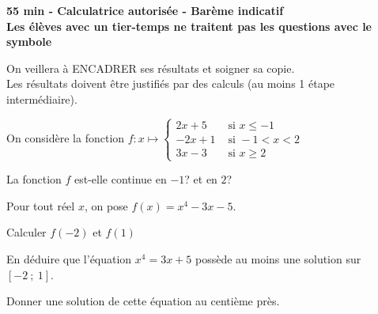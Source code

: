 \documentclass[11pt,a4paper]{article}  %
\begin{document}
	\graphicspath{{images/}}
	
	\begin{center}
		
	\end{center}
	\begin{center}\textbf{55 min - Calculatrice autorisée - Barème indicatif}\\
		\textbf{Les élèves avec un tier-temps ne traitent pas les questions avec  le symbole }
	\end{center}
	
	\begin{center}
		On veillera à ENCADRER ses résultats et soigner sa copie.\\
		Les résultats doivent être justifiés par des calculs (au moins 1 étape intermédiaire).
	\end{center}


On considère la fonction $f: x \mapsto \begin{cases}2 x+5 & \text { si } x \leqslant-1 \\ -2 x+1 & \text { si }-1<x<2  \\ 3x-3 & \text { si } x \geqslant 2\end{cases}$

La fonction $f$ est-elle continue en $-1$? et en $2$?


Pour tout réel $x$, on pose $f(x)=x^4-3 x-5$.
\begin{enumMet}
	\item {} Calculer $f(-2)$ et $f(1)$
	\item {} En déduire que l'équation $x^4=3 x+5$ possède au moins une solution sur $[-2\ ;\ 1]$.
	\item {} Donner une solution de cette équation au centième près.
\end{enumMet}

%
\end{document}
